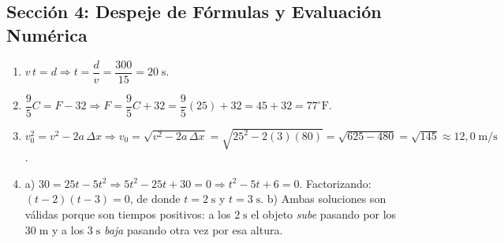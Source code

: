 \documentclass[12pt, letterpaper]{article}
\begin{document}
  \newpage

  \subsection*{Sección 4: Despeje de Fórmulas y Evaluación Numérica}

  \begin{enumerate}[leftmargin=*, label=\textbf{\arabic*.}]
    \item $v\,t = d \Rightarrow t = \dfrac{d}{v} = \dfrac{300}{15} = 20\;\text{s}$.

    \item $\dfrac{9}{5}C = F - 32 \Rightarrow F = \dfrac{9}{5}C + 32 = \dfrac{9}{5}(25) + 32 = 45 + 32 = 77^{\circ}\text{F}$.

    \item $v_0^2 = v^2 - 2a\,\Delta x \Rightarrow v_0 = \sqrt{v^2 - 2a\,\Delta x} = \sqrt{25^2 - 2(3)(80)} = \sqrt{625 - 480} = \sqrt{145} \approx 12{,}0\;\text{m/s}$.

    \item a) $30 = 25t - 5t^2 \Rightarrow 5t^2 - 25t + 30 = 0 \Rightarrow t^2 - 5t + 6 = 0$. Factorizando: $(t - 2)(t - 3) = 0$, de donde $t = 2\;\text{s}$ y $t = 3\;\text{s}$.
          \quad b) Ambas soluciones son válidas porque son tiempos positivos: a los $2\;\text{s}$ el objeto \emph{sube} pasando por los $30\;\text{m}$ y a los $3\;\text{s}$ \emph{baja} pasando otra vez por esa altura.
  \end{enumerate}

\fi
\end{document}
